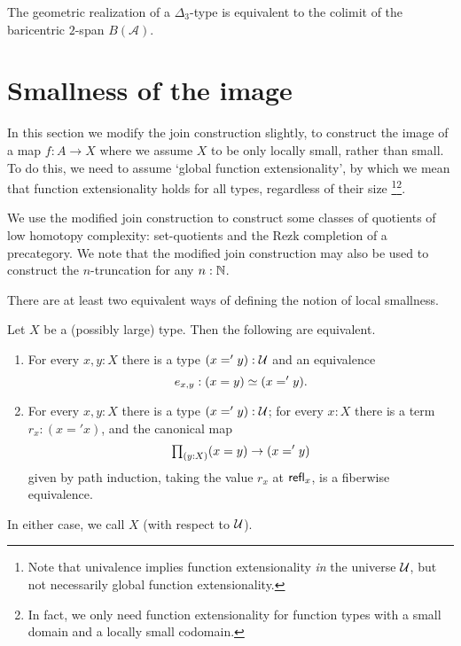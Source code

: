 \begin{thm}
The geometric realization of a $\Delta_3$-type is equivalent to the colimit of the baricentric $2$-span $B(\mathcal{A})$. 
\end{thm}

\section{Smallness of the image}\label{sec:modified-join}

In this section we modify the join construction slightly, to construct the
image of a map $f:A\to X$ where we assume $X$ to be only locally small, rather than
small. To do this, we need to assume `global function extensionality', by which
we mean that function extensionality holds for all types, regardless of their {size
\footnote{Note that univalence implies function extensionality \emph{in} the universe $\mathcal{U}$, but not necessarily global function extensionality.}}\footnote{In fact, we only need function extensionality for function types with a small domain and a locally small codomain.}.

We use the modified join construction to construct some classes of quotients
of low homotopy complexity: 
set-quotients and the Rezk completion of a precategory. 
We note that the modified join construction may also be used to construct
the $n$-truncation for any $n:\mathbb{N}$. 

There are at least two equivalent ways of defining the notion of local smallness.

\begin{lem}
Let $X$ be a (possibly large) type. Then the following are equivalent.
\begin{enumerate}
\item For every $x,y:X$ there is a type $(x='y):\mathcal{U}$ and an equivalence
\begin{equation*}
e_{x,y}:\eqv{(x=y)}{(x='y)}.
\end{equation*}
\item For every $x,y:X$ there is a type $(x='y):\mathcal{U}$; for every $x:X$ there
is a term $r_x : (x='x)$, and the canonical map
\begin{equation*}
\prd{y:X} (x=y)\to (x='y)
\end{equation*}
given by path induction, taking the value $r_x$ at $\mathsf{refl}_{x}$, is a fiberwise equivalence.
\end{enumerate}
In either case, we call $X$  (with respect to $\mathcal{U}$).
\end{lem}

